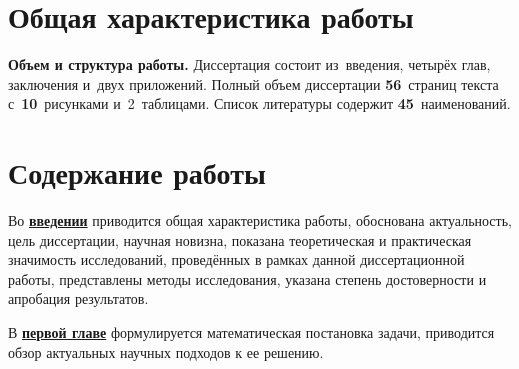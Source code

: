 \section*{Общая характеристика работы}

\newcommand{\actuality}{\textbf{\actualityTXT}}
\newcommand{\progress}{\textbf{\progressTXT}}
\newcommand{\actualityandprogress}{\textbf{\actualityandprogressTXT}}
\newcommand{\aim}{{\textbf\aimTXT}}
\newcommand{\tasks}{\textbf{\tasksTXT}}
\newcommand{\novelty}{\textbf{\noveltyTXT}}
\newcommand{\influence}{\textbf{\influenceTXT}}
\newcommand{\methods}{\textbf{\methodsTXT}}
\newcommand{\defpositions}{\textbf{\defpositionsTXT}}
\newcommand{\reliability}{\textbf{\reliabilityTXT}}
\newcommand{\probation}{\textbf{\probationTXT}}
\newcommand{\contribution}{\textbf{\contributionTXT}}
\newcommand{\publications}{\textbf{\publicationsTXT}}






\textbf{Объем и структура работы.} Диссертация состоит из~введения, четырёх глав, заключения и~двух приложений.
Полный объем диссертации \textbf{56}~страниц текста с~\textbf{10}~рисунками и~2~таблицами. Список литературы содержит \textbf{45}~наименований.

\section*{Содержание работы}
Во \underline{\textbf{введении}} приводится общая характеристика работы, 
обоснована актуальность, цель диссертации, научная новизна, показана теоретическая и практическая значимость исследований, проведённых в рамках данной диссертационной работы, представлены методы исследования, указана степень достоверности и апробация результатов.

В \underline{\textbf{первой главе}} формулируется математическая постановка задачи, приводится обзор актуальных научных подходов к ее решению.

